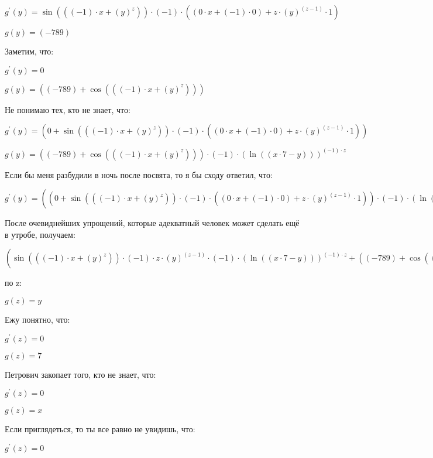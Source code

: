 \documentclass[a4paper,12pt]{article}
\begin{document}
\begin{flushleft}
$g^{'}(y) = \sin {(((-1) \cdot x+(y)^{z}))} \cdot (-1) \cdot ((0 \cdot x+(-1) \cdot 0)+z \cdot (y)^{(z-1)} \cdot 1)$

$g(y) = (-789)$

Заметим, что:

$g^{'}(y) = 0$

$g(y) = ((-789)+\cos {(((-1) \cdot x+(y)^{z}))})$

Не понимаю тех, кто не знает, что:

$g^{'}(y) = (0+\sin {(((-1) \cdot x+(y)^{z}))} \cdot (-1) \cdot ((0 \cdot x+(-1) \cdot 0)+z \cdot (y)^{(z-1)} \cdot 1))$

$g(y) = ((-789)+\cos {(((-1) \cdot x+(y)^{z}))}) \cdot (-1) \cdot (\ln {((x \cdot 7-y))})^{(-1) \cdot z}$

Если бы меня разбудили в ночь после посвята, то я бы сходу ответил, что:

$g^{'}(y) = ((0+\sin {(((-1) \cdot x+(y)^{z}))} \cdot (-1) \cdot ((0 \cdot x+(-1) \cdot 0)+z \cdot (y)^{(z-1)} \cdot 1)) \cdot (-1) \cdot (\ln {((x \cdot 7-y))})^{(-1) \cdot z}+((-789)+\cos {(((-1) \cdot x+(y)^{z}))}) \cdot (0 \cdot (\ln {((x \cdot 7-y))})^{(-1) \cdot z}+(-1) \cdot (\ln {((x \cdot 7-y))})^{(-1) \cdot z} \cdot ((0 \cdot z+(-1) \cdot 0) \cdot \ln {(\ln {((x \cdot 7-y))})}+(-1) \cdot z \cdot  \dfrac{1}{\ln {((x \cdot 7-y))}}  \cdot  \dfrac{1}{(x \cdot 7-y)}  \cdot ((0 \cdot 7+x \cdot 0)-1))))$

После очевиднейших упрощений, которые адекватный человек может сделать ещё в утробе, получаем:

$(\sin {(((-1) \cdot x+(y)^{z}))} \cdot (-1) \cdot z \cdot (y)^{(z-1)} \cdot (-1) \cdot (\ln {((x \cdot 7-y))})^{(-1) \cdot z}+((-789)+\cos {(((-1) \cdot x+(y)^{z}))}) \cdot (-1) \cdot (\ln {((x \cdot 7-y))})^{(-1) \cdot z} \cdot (-1) \cdot z \cdot  \dfrac{1}{\ln {((x \cdot 7-y))}}  \cdot  \dfrac{1}{(x \cdot 7-y)}  \cdot (-1))$

 по z:

$g(z) = y$

Ежу понятно, что:

$g^{'}(z) = 0$

$g(z) = 7$

Петрович закопает того, кто не знает, что:

$g^{'}(z) = 0$

$g(z) = x$

Если приглядеться, то ты все равно не увидишь, что:

$g^{'}(z) = 0$


\end{flushleft}
\end{document}
